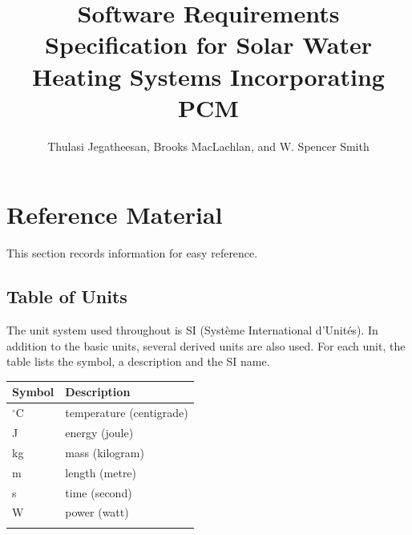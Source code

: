 \documentclass[12pt]{article}
\title{Software Requirements Specification for Solar Water Heating Systems Incorporating PCM}
\author{Thulasi Jegatheesan, Brooks MacLachlan, and W. Spencer Smith}
\begin{document}
\maketitle
\tableofcontents
\newpage
\section{Reference Material}
\label{Sec:RefMat}
This section records information for easy reference.
\subsection{Table of Units}
\label{Sec:ToU}
The unit system used throughout is SI (Système International d'Unités). In addition to the basic units, several derived units are also used. For each unit, the table lists the symbol, a description and the SI name.
\begin{longtable*}{l l}
\toprule
Symbol & Description
\\
\midrule
${}^{\circ}$C & temperature (centigrade)
\\
J & energy (joule)
\\
kg & mass (kilogram)
\\
m & length (metre)
\\
s & time (second)
\\
W & power (watt)
\\
\bottomrule
\label{Table:ToU}
\end{longtable*}
\end{document}
